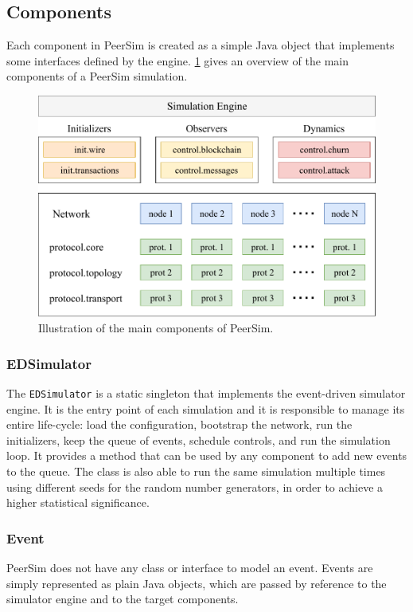 \subsection{Components}
Each component in PeerSim is created as a simple Java object that implements some interfaces defined by the engine.
\cref{fig:peersim} gives an overview of the main components of a PeerSim simulation.

\begin{figure}[ht]
	\centering
	\vspace*{0.25cm}
	\includegraphics[scale=0.9]{figures/peersim}
	\vspace*{0.2cm}
	\caption[Illustration of the main components of PeerSim]{Illustration of the main components of PeerSim.}
	\label{fig:peersim}
\end{figure}

\subsubsection{EDSimulator}
The \texttt{EDSimulator} is a static singleton that implements the event-driven simulator engine.
It is the entry point of each simulation and it is responsible to manage its entire life-cycle:
load the configuration, bootstrap the network, run the initializers, keep the queue of events, schedule controls, and run the simulation loop.
It provides a method that can be used by any component to add new events to the queue.
The class is also able to run the same simulation multiple times using different seeds for the random number generators, in order to achieve a higher statistical significance.

\subsubsection{Event}
PeerSim does not have any class or interface to model an event.
Events are simply represented as plain Java objects, which are passed by reference to the simulator engine and to the target components.

